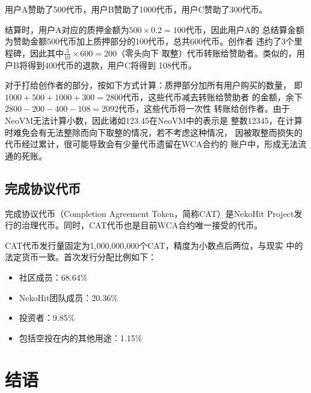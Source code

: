 \documentclass[11pt,UTF8,a4paper]{ctexart}
\begin{document}
    用户A赞助了500代币，用户B赞助了1000代币，用户C赞助了300代币。

    结算时，用户A对应的质押金额为$500 \times 0.2 = 100$代币，因此用户A的
    总结算金额为赞助金额500代币加上质押部分的100代币，总共600代币。创作者
    违约了3个里程碑，因此其中$\frac{3}{10} \times 600 = 200$（零头向下
    取整）代币转账给赞助者。类似的，用户B将得到400代币的退款，用户C将得到
    108代币。

    对于打给创作者的部分，按如下方式计算：质押部分加所有用户购买的数量，
    即$1000 + 500 + 1000 + 300 = 2800$代币，这些代币减去转账给赞助者
    的金额，余下$2800 - 200 - 400 - 108 = 2092$代币，这些代币将一次性
    转账给创作者。由于NeoVM无法计算小数，因此诸如123.45在NeoVM中的表示是
    整数12345，在计算时难免会有无法整除而向下取整的情况，若不考虑这种情况，
    因被取整而损失的代币经过累计，很可能导致会有少量代币遗留在WCA合约的
    账户中，形成无法流通的死账。

    \subsection{完成协议代币}\label{subsec:cat}

    完成协议代币（Completion Agreement Token，简称CAT）是NekoHit
    Project发行的治理代币。同时，CAT代币也是目前WCA合约唯一接受的代币。

    CAT代币发行量固定为1,000,000,000个CAT，精度为小数点后两位，与现实
    中的法定货币一致。首次发行分配比例如下：

    \begin{itemize}
        \item 社区成员：68.64\%
        \item NekoHit团队成员：20.36\%
        \item 投资者：9.85\%
        \item 包括空投在内的其他用途：1.15\%
    \end{itemize}


    \section{结语}\label{sec:end}
\end{document}
